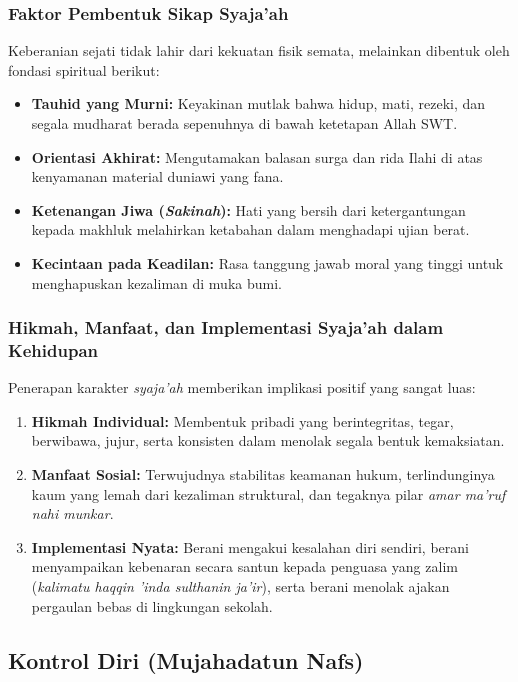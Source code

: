 \documentclass[12pt, a4paper]{article}
\begin{document}
\subsubsection{Faktor Pembentuk Sikap Syaja'ah}
Keberanian sejati tidak lahir dari kekuatan fisik semata, melainkan dibentuk oleh fondasi spiritual berikut:
\begin{itemize}
    \item \textbf{Tauhid yang Murni:} Keyakinan mutlak bahwa hidup, mati, rezeki, dan segala mudharat berada sepenuhnya di bawah ketetapan Allah SWT.
    \item \textbf{Orientasi Akhirat:} Mengutamakan balasan surga dan rida Ilahi di atas kenyamanan material duniawi yang fana.
    \item \textbf{Ketenangan Jiwa (\textit{Sakinah}):} Hati yang bersih dari ketergantungan kepada makhluk melahirkan ketabahan dalam menghadapi ujian berat.
    \item \textbf{Kecintaan pada Keadilan:} Rasa tanggung jawab moral yang tinggi untuk menghapuskan kezaliman di muka bumi.
\end{itemize}

\subsubsection{Hikmah, Manfaat, dan Implementasi Syaja'ah dalam Kehidupan}
Penerapan karakter \textit{syaja'ah} memberikan implikasi positif yang sangat luas:
\begin{enumerate}
    \item \textbf{Hikmah Individual:} Membentuk pribadi yang berintegritas, tegar, berwibawa, jujur, serta konsisten dalam menolak segala bentuk kemaksiatan.
    \item \textbf{Manfaat Sosial:} Terwujudnya stabilitas keamanan hukum, terlindunginya kaum yang lemah dari kezaliman struktural, dan tegaknya pilar \textit{amar ma'ruf nahi munkar}.
    \item \textbf{Implementasi Nyata:} Berani mengakui kesalahan diri sendiri, berani menyampaikan kebenaran secara santun kepada penguasa yang zalim (\textit{kalimatu haqqin 'inda sulthanin ja'ir}), serta berani menolak ajakan pergaulan bebas di lingkungan sekolah.
\end{enumerate}

\subsection{Kontrol Diri (Mujahadatun Nafs)}
\end{document}
